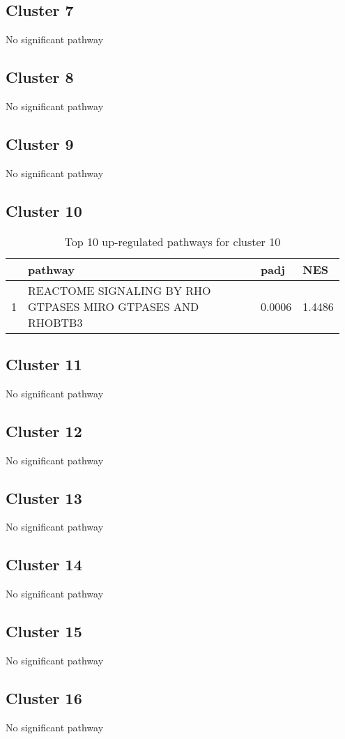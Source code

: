 \documentclass{article}
\begin{document}
\subsection{Cluster 7 }
No significant pathway
\subsection{Cluster 8 }
No significant pathway
\subsection{Cluster 9 }
No significant pathway
\subsection{Cluster 10 }
\begin{table}[H]
\centering
\begin{tabular}{p{0.05\linewidth}p{0.7\linewidth}p{0.1\linewidth}p{0.1\linewidth}}
  \hline
 & pathway & padj & NES \\ 
  \hline
1 & REACTOME SIGNALING BY RHO GTPASES MIRO GTPASES AND RHOBTB3 & 0.0006 & 1.4486 \\ 
   \hline
\end{tabular}
\caption{Top 10 up-regulated pathways for cluster 10} 
\label{tab:q3_2_10}
\end{table}
\subsection{Cluster 11 }
No significant pathway
\subsection{Cluster 12 }
No significant pathway
\subsection{Cluster 13 }
No significant pathway
\subsection{Cluster 14 }
No significant pathway
\subsection{Cluster 15 }
No significant pathway
\subsection{Cluster 16 }
No significant pathway
\end{document}
